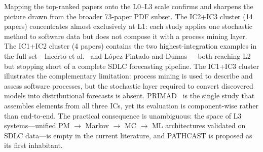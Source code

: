 Mapping the top-ranked papers onto the L0--L3 scale confirms and sharpens
the picture drawn from the broader 73-paper PDF subset.
The IC2+IC3 cluster (14 papers) concentrates almost exclusively at L1: each
study applies one stochastic method to software data but does not compose it
with a process mining layer. The IC1+IC2 cluster (4 papers) contains the
two highest-integration examples in the full set---Incerto et
al.~\cite{incerto2025} and L\'opez-Pintado and Dumas~\cite{lopezpintado2023}---both
reaching L2 but stopping short of a complete SDLC forecasting pipeline.
The IC1+IC3 cluster illustrates the complementary limitation: process mining
is used to describe and assess software processes, but the stochastic layer
required to convert discovered models into distributional forecasts is absent.
PRIMAD~\cite{guinea2025} is the single study that assembles elements from
all three ICs, yet its evaluation is component-wise rather than end-to-end.
The practical consequence is unambiguous: the space of L3 systems---unified
PM $\rightarrow$ Markov $\rightarrow$ MC $\rightarrow$ ML architectures
validated on SDLC data---is empty in the current literature, and PATHCAST
is proposed as its first inhabitant.



%
%
%
%

